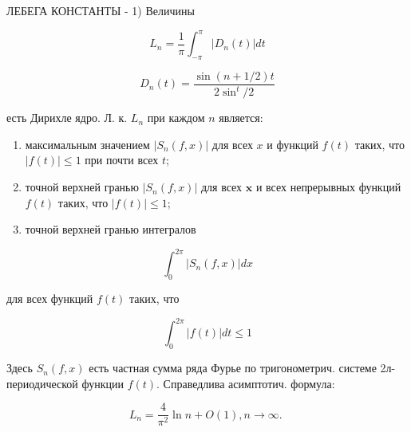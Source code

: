 \documentclass[10pt]{article}
\begin{document}
ЛЕБЕГА КОНСТАНТЫ - 1) Величины



\[

L_{n}=\frac{1}{\pi} \int_{-\pi}^{\pi}\left|D_{n}(t)\right| d t

\]



\[

D_{n}(t)=\frac{\sin (n+1 / 2) t}{2 \sin ^{t} / 2}

\]



есть Дирихле ядро. Л. к. $L_{n}$ при каждом $n$ является:



\begin{enumerate}

  \item максимальным значением $\left|S_{n}(f, x)\right|$ для всех $x$ и функций $f(t)$ таких, что $|f(t)| \leqslant 1$ при почти всех $t$;



  \item точной верхней гранью $\left|S_{n}(f, x)\right|$ для всех $\boldsymbol{x}$ и всех непрерывных функций $f(t)$ таких, что $|f(t)| \leqslant 1$;



  \item точной верхней гранью интегралов



\end{enumerate}



\[

\int_{0}^{2 \pi}\left|S_{n}(f, x)\right| d x

\]



для всех функций $f(t)$ таких, что



\[

\int_{0}^{2 \pi}|f(t)| d t \leqslant 1

\]



Здесь $S_{n}(f, x)$ есть частная сумма ряда Фурье по тригонометрич. системе 2л-периодической функции $f(t)$. Справедлива асимптотич. формула:



\[

L_{n}=\frac{4}{\pi^{2}} \ln n+O(1), n \longrightarrow \infty \text {. }

\]
\end{document}
